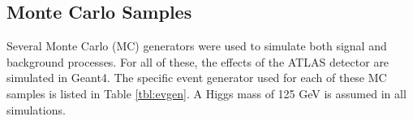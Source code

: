 \subsection{Monte Carlo Samples}
\label{sec:MCsamples}

Several Monte Carlo (MC) generators were used to simulate both signal and background processes. For all of these, the effects of the ATLAS detector are simulated in Geant4. The specific event generator used for each of these MC samples is listed in Table \ref{tbl:evgen}. A Higgs mass of 125 GeV is assumed in all simulations.

\begin{table}[H]
\begin{center}                                                                                                                \caption{\label{tbl:evgen} The configurations used for event generation of signal and background processes, including the event generator, matrix element (ME) order, parton shower algorithm, and parton distribution functin (PDF). }
\end{center}
\end{table}
